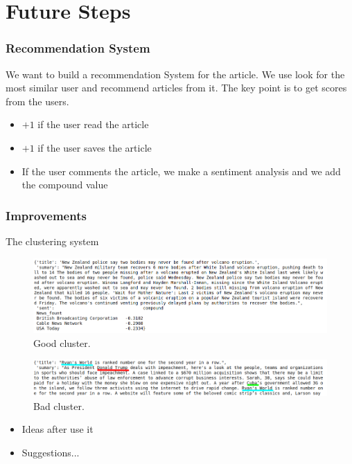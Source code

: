 \documentclass[12pt]{beamer}
\begin{document}
\section{Future Steps}
\begin{frame}
\frametitle{Recommendation System}
We want to build a recommendation System for the article.
We use look for the most similar user and recommend articles from it.
The key point is to get scores from the users.
\begin{itemize}
\item $+1$ if the user read the article
\item $+1$ if the user saves the article
\item If the user comments the article, we make a sentiment analysis  and we add the compound value
\end{itemize}
\end{frame}
\begin{frame}
\frametitle{Improvements}

 The clustering system
 \begin{figure}  \label{fig:good}
  
  
   \includegraphics[width=1  \textwidth]{good.png}
  \caption{Good cluster.}
  \label{fig:good}
\end{figure}



\begin{figure}  \label{fig:bad}
  
  
   \includegraphics[width=1\textwidth]{bad.png}
  \caption{Bad cluster.}
  \label{fig:bad}
\end{figure}
\end{frame}



\begin{frame}
\begin{itemize}
\item Ideas after use it
\item Suggestions...
\end{itemize}
\end{frame}
\end{document}
